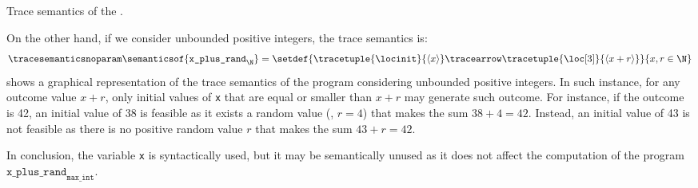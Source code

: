 \begin{example}
\begin{marginfigure}
\begin{tikzpicture}[scale=0.8]
\end{tikzpicture}
\caption{Trace semantics of the .}
\end{marginfigure}
On the other hand, if we consider unbounded positive integers, the trace semantics is:
\begin{align*}
  \tracesemanticsnoparam\semanticsof{\texttt{x\_plus\_rand}_\N}
  =
  \setdef{
    \tracetuple{\locinit}{\langle{x}\rangle}\tracearrow\tracetuple{\loc[3]}{\langle{x+r}\rangle}
  }{x, r \in \N}
\end{align*}
 shows a graphical representation of the trace semantics of the program  considering unbounded positive integers.
In such instance, for any outcome value $x+r$, only initial values of \texttt{x} that are equal or smaller than $x+r$ may generate such outcome.
For instance, if the outcome is 42, an initial value of 38 is feasible as it exists a random value (\eg, $r = 4$) that makes the sum $38 + 4 = 42$. Instead, an initial value of 43 is not feasible as there is no positive random value $r$ that makes the sum $43 + r = 42$.

In conclusion, the variable \texttt{x} is syntactically used, but it may be semantically unused as it does not affect the computation of the program $\texttt{x\_plus\_rand}_{\texttt{max\_int}}$.

\end{example}

